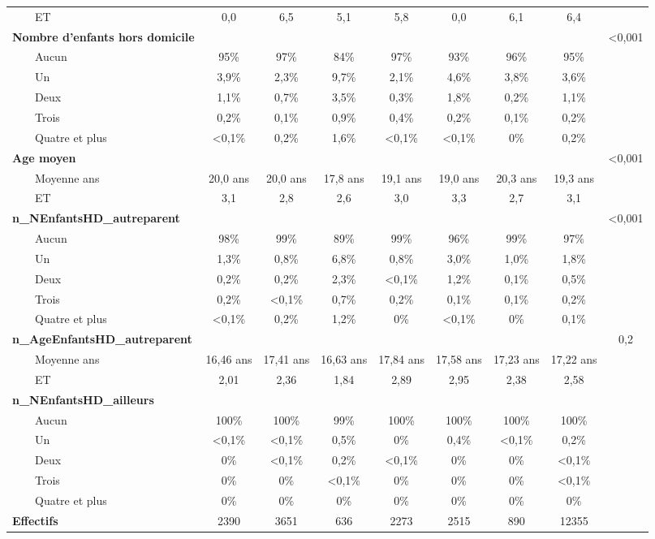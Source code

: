 \documentclass[
  12pt,
]{book}
\begin{document}
\begin{longtable}{lcccccccc}
    ET & 0,0 & 6,5 & 5,1 & 5,8 & 0,0 & 6,1 & 6,4 &  \\ 
{\bfseries Nombre d'enfants hors domicile} &  &  &  &  &  &  &  & <0,001 \\ 
    Aucun & 95\% & 97\% & 84\% & 97\% & 93\% & 96\% & 95\% &  \\ 
    Un & 3,9\% & 2,3\% & 9,7\% & 2,1\% & 4,6\% & 3,8\% & 3,6\% &  \\ 
    Deux & 1,1\% & 0,7\% & 3,5\% & 0,3\% & 1,8\% & 0,2\% & 1,1\% &  \\ 
    Trois & 0,2\% & 0,1\% & 0,9\% & 0,4\% & 0,2\% & 0,1\% & 0,2\% &  \\ 
    Quatre et plus & <0,1\% & 0,2\% & 1,6\% & <0,1\% & <0,1\% & 0\% & 0,2\% &  \\ 
{\bfseries Age moyen} &  &  &  &  &  &  &  & <0,001 \\ 
    Moyenne ans & 20,0 ans & 20,0 ans & 17,8 ans & 19,1 ans & 19,0 ans & 20,3 ans & 19,3 ans &  \\ 
    ET & 3,1 & 2,8 & 2,6 & 3,0 & 3,3 & 2,7 & 3,1 &  \\ 
{\bfseries n\_NEnfantsHD\_autreparent} &  &  &  &  &  &  &  & <0,001 \\ 
    Aucun & 98\% & 99\% & 89\% & 99\% & 96\% & 99\% & 97\% &  \\ 
    Un & 1,3\% & 0,8\% & 6,8\% & 0,8\% & 3,0\% & 1,0\% & 1,8\% &  \\ 
    Deux & 0,2\% & 0,2\% & 2,3\% & <0,1\% & 1,2\% & 0,1\% & 0,5\% &  \\ 
    Trois & 0,2\% & <0,1\% & 0,7\% & 0,2\% & 0,1\% & 0,1\% & 0,2\% &  \\ 
    Quatre et plus & <0,1\% & 0,2\% & 1,2\% & 0\% & <0,1\% & 0\% & 0,1\% &  \\ 
{\bfseries n\_AgeEnfantsHD\_autreparent} &  &  &  &  &  &  &  & 0,2 \\ 
    Moyenne ans & 16,46 ans & 17,41 ans & 16,63 ans & 17,84 ans & 17,58 ans & 17,23 ans & 17,22 ans &  \\ 
    ET & 2,01 & 2,36 & 1,84 & 2,89 & 2,95 & 2,38 & 2,58 &  \\ 
{\bfseries n\_NEnfantsHD\_ailleurs} &  &  &  &  &  &  &  &  \\ 
    Aucun & 100\% & 100\% & 99\% & 100\% & 100\% & 100\% & 100\% &  \\ 
    Un & <0,1\% & <0,1\% & 0,5\% & 0\% & 0,4\% & <0,1\% & 0,2\% &  \\ 
    Deux & 0\% & <0,1\% & 0,2\% & <0,1\% & 0\% & 0\% & <0,1\% &  \\ 
    Trois & 0\% & 0\% & <0,1\% & 0\% & 0\% & 0\% & <0,1\% &  \\ 
    Quatre et plus & 0\% & 0\% & 0\% & 0\% & 0\% & 0\% & 0\% &  \\ 
{\bfseries Effectifs} & 2390 & 3651 & 636 & 2273 & 2515 & 890 & 12355 &  \\ 
\bottomrule
\end{longtable}
\end{document}

